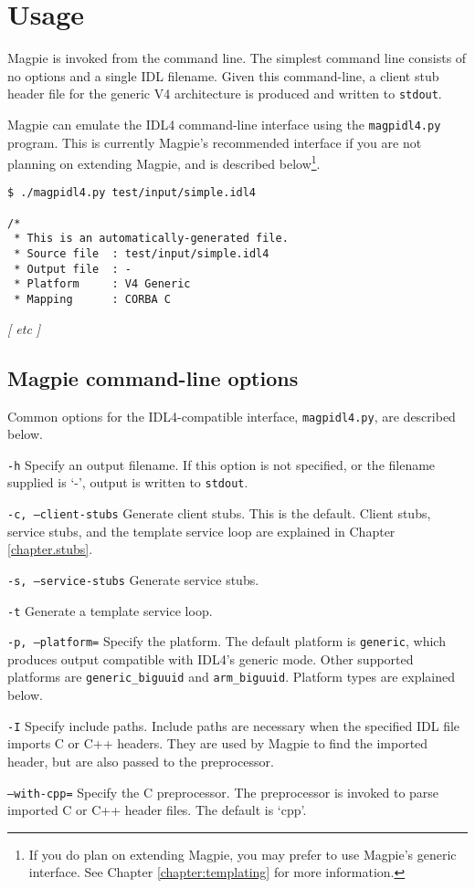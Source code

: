 \chapter{Usage}

Magpie is invoked from the command line. The simplest command line consists of no options and a single IDL filename. Given this command-line, a client stub header file for the generic V4 architecture is produced and written to {\tt stdout}.

Magpie can emulate the IDL4 command-line interface using the {\tt magpidl4.py} program. This is currently Magpie's recommended interface if you are not planning on extending Magpie, and is described below\footnote{If you do plan on extending Magpie, you may prefer to use Magpie's generic interface. See Chapter \ref{chapter:templating} for more information.}.

\begin{verbatim}
$ ./magpidl4.py test/input/simple.idl4

/* 
 * This is an automatically-generated file.
 * Source file  : test/input/simple.idl4
 * Output file  : -
 * Platform     : V4 Generic
 * Mapping      : CORBA C
\end{verbatim}
{\it[ etc ]}

\section{Magpie command-line options}
Common options for the IDL4-compatible interface, {\tt magpidl4.py}, are described below.

\begin{description}
\item{{\tt -h}} Specify an output filename. If this option is not specified, or the filename supplied is `-', output is written to {\tt stdout}.
\item{{\tt -c, --client-stubs}} Generate client stubs. This is the default. Client stubs, service stubs, and the template service loop are explained in Chapter \ref{chapter.stubs}.
\item{{\tt -s, --service-stubs}} Generate service stubs.
\item{{\tt -t}} Generate a template service loop.
\item{{\tt -p, --platform=}} Specify the platform. The default platform is {\tt generic}, which produces output compatible with IDL4's generic mode. Other supported platforms are {\tt generic\_biguuid} and {\tt arm\_biguuid}. Platform types are explained below.
\item{{\tt -I}} Specify include paths. Include paths are necessary when the specified IDL file imports C or C++ headers. They are used by Magpie to find the imported header, but are also passed to the preprocessor.
\item{{\tt --with-cpp=}} Specify the C preprocessor. The preprocessor is invoked to parse imported C or C++ header files. The default is `cpp'. 
\end{description}

